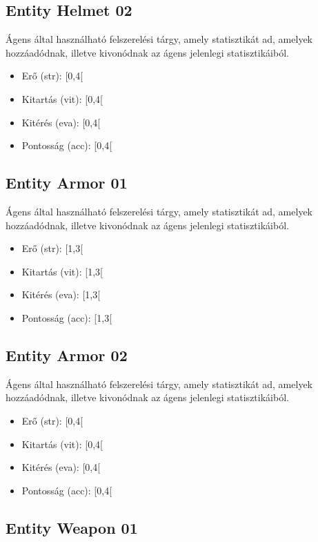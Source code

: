 \subsection{Entity Helmet 02}


Ágens által használható felszerelési tárgy, amely statisztikát ad, amelyek hozzáadódnak, illetve kivonódnak az ágens jelenlegi statisztikáiból.

\begin{itemize}
    \item Erő (str): [0,4[
    \item Kitartás (vit): [0,4[
    \item Kitérés (eva): [0,4[
    \item Pontosság (acc): [0,4[
\end{itemize}

\subsection{Entity Armor 01}

Ágens által használható felszerelési tárgy, amely statisztikát ad, amelyek hozzáadódnak, illetve kivonódnak az ágens jelenlegi statisztikáiból.

\begin{itemize}
    \item Erő (str): [1,3[
    \item Kitartás (vit): [1,3[
    \item Kitérés (eva): [1,3[
    \item Pontosság (acc): [1,3[
\end{itemize}

\subsection{Entity Armor 02}


Ágens által használható felszerelési tárgy, amely statisztikát ad, amelyek hozzáadódnak, illetve kivonódnak az ágens jelenlegi statisztikáiból.

\begin{itemize}
    \item Erő (str): [0,4[
    \item Kitartás (vit): [0,4[
    \item Kitérés (eva): [0,4[
    \item Pontosság (acc): [0,4[
\end{itemize}

\subsection{Entity Weapon 01}


